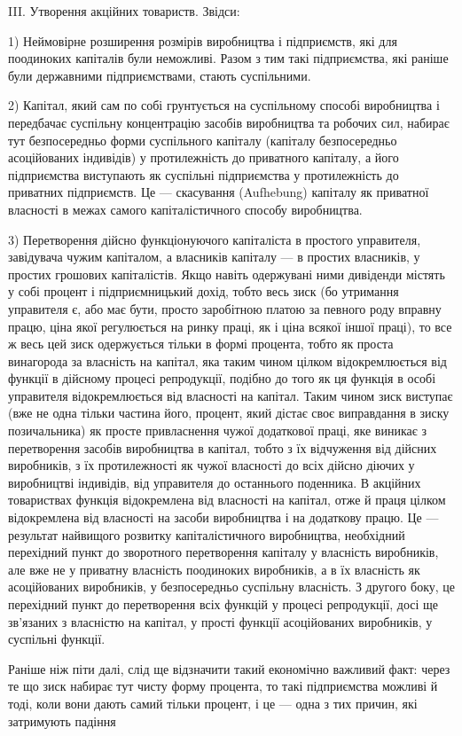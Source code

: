 \parcont{}  %
III. Утворення акційних товариств. Звідси:

1) Неймовірне розширення розмірів виробництва і підприємств, які для поодиноких капіталів були
неможливі. Разом з тим
такі підприємства, які раніше були державними підприємствами,
стають суспільними.

2) Капітал, який сам по собі грунтується на суспільному
способі виробництва і передбачає суспільну концентрацію засобів виробництва та робочих сил, набирає
тут безпосередньо
форми суспільного капіталу (капіталу безпосередньо асоційованих індивідів) у протилежність до
приватного капіталу, а його
підприємства виступають як суспільні підприємства у протилежність до приватних підприємств. Це —
скасування (Aufhebung)
капіталу як приватної власності в межах самого капіталістичного способу виробництва.

3) Перетворення дійсно функціонуючого капіталіста в простого управителя, завідувача чужим капіталом,
а власників
капіталу — в простих власників, у простих грошових капіталістів. Якщо навіть одержувані ними
дивіденди містять у собі
процент і підприємницький дохід, тобто весь зиск (бо утримання управителя є, або має бути, просто
заробітною платою за
певного роду вправну працю, ціна якої регулюється на ринку
праці, як і ціна всякої іншої праці), то все ж весь цей зиск
одержується тільки в формі процента, тобто як проста винагорода за власність на капітал, яка таким
чином цілком відокремлюється від функції в дійсному процесі репродукції, подібно
до того як ця функція в особі управителя відокремлюється від
власності на капітал. Таким чином зиск виступає (вже не одна
тільки частина його, процент, який дістає своє виправдання
в зиску позичальника) як просте привласнення чужої додаткової
праці, яке виникає з перетворення засобів виробництва в капітал, тобто з їх відчуження від дійсних
виробників, з їх протилежності як чужої власності до всіх дійсно діючих у виробництві індивідів, від
управителя до останнього поденника.
В акційних товариствах функція відокремлена від власності на
капітал, отже й праця цілком відокремлена від власності на
засоби виробництва і на додаткову працю. Це — результат найвищого розвитку капіталістичного
виробництва, необхідний
перехідний пункт до зворотного перетворення капіталу у власність виробників, але вже не у приватну
власність поодиноких
виробників, а в їх власність як асоційованих виробників, у безпосередньо суспільну власність. З
другого боку, це перехідний пункт до перетворення всіх функцій у процесі репродукції,
досі ще зв’язаних з власністю на капітал, у прості функції асоційованих виробників, у суспільні
функції.

Раніше ніж піти далі, слід ще відзначити такий економічно
важливий факт: через те що зиск набирає тут чисту форму процента, то такі підприємства можливі й
тоді, коли вони дають самий
тільки процент, і це — одна з тих причин, які затримують падіння
\parbreak{}  %

